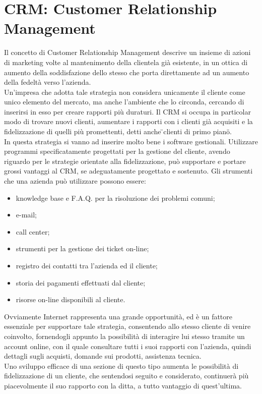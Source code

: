 \section{CRM: Customer Relationship Management}
Il concetto di Customer Relationship Management descrive un insieme di azioni di marketing volte al mantenimento della clientela gi\` a esistente, in un ottica di aumento della soddisfazione dello stesso che porta direttamente ad un aumento della fedelt\` a verso l'azienda.  \\
Un'impresa che adotta tale strategia non considera unicamente il cliente come unico elemento del mercato, ma anche l'ambiente che lo circonda, cercando di inserirsi in esso per creare rapporti pi\` u duraturi. Il CRM si occupa in particolar modo di trovare nuovi clienti, aumentare i rapporti con i clienti gi\`a  acquisiti e la fidelizzazione di quelli pi\` u promettenti, detti anche \"{}clienti di primo piano\"{}.  \\
In questa strategia si vanno ad inserire molto bene i software gestionali. Utilizzare programmi specificatamente progettati per la gestione del cliente, avendo riguardo per le strategie orientate alla fidelizzazione, pu\` o supportare e portare grossi vantaggi al CRM, se adeguatamente progettato e sostenuto. Gli strumenti che una azienda pu\` o utilizzare possono essere: 
  \begin{itemize}
    \item  knowledge base e F.A.Q. per la risoluzione dei problemi comuni;
    \item  e-mail;
    \item  call center;
    \item  strumenti per la gestione dei ticket on-line;
    \item  registro dei contatti tra l'azienda ed il cliente;
    \item  storia dei pagamenti effettuati dal cliente;
    \item  risorse on-line disponibili al cliente.
  \end{itemize}
\noindent
Ovviamente Internet rappresenta una grande opportunit\`a, ed \`e un fattore essenziale per supportare tale strategia, consentendo allo stesso cliente di venire coinvolto, fornendogli appunto la possibilit\`a di interagire lui stesso tramite un account online, con il quale consultare tutti i suoi rapporti con l'azienda, quindi dettagli sugli acquisti, domande sui prodotti, assistenza tecnica. \\
Uno sviluppo efficace di una sezione di questo tipo aumenta le possibilit\`a di fidelizzazione di un cliente, che sentendosi seguito e considerato, continuer\`a pi\`u piacevolmente il suo rapporto con la ditta, a tutto vantaggio di quest'ultima. 

